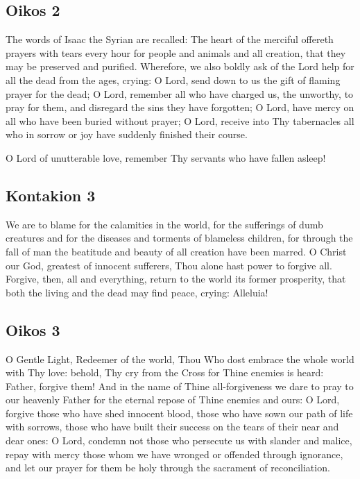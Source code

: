 \subsection{Oikos 2}

The words of Isaac the Syrian are recalled: The heart of the merciful offereth prayers with tears every hour for people and animals and all creation, that they may be preserved and purified. Wherefore, we also boldly ask of the Lord help for all the dead from the ages, crying: O Lord, send down to us the gift of flaming prayer for the dead; O Lord, remember all who have charged us, the unworthy, to pray for them, and disregard the sins they have forgotten; O Lord, have mercy on all who have been buried without prayer; O Lord, receive into Thy tabernacles all who in sorrow or joy have suddenly finished their course.

O Lord of unutterable love, remember Thy servants who have fallen asleep!

\subsection{Kontakion 3}

We are to blame for the calamities in the world, for the sufferings of dumb creatures and for the diseases and torments of blameless children, for through the fall of man the beatitude and beauty of all creation have been marred. O Christ our God, greatest of innocent sufferers, Thou alone hast power to forgive all. Forgive, then, all and everything, return to the world its former prosperity, that both the living and the dead may find peace, crying: Alleluia!

\subsection{Oikos 3}

O Gentle Light, Redeemer of the world, Thou Who dost embrace the whole world with Thy love: behold, Thy cry from the Cross for Thine enemies is heard: Father, forgive them! And in the name of Thine all-forgiveness we dare to pray to our heavenly Father for the eternal repose of Thine enemies and ours: O Lord, forgive those who have shed innocent blood, those who have sown our path of life with sorrows, those who have built their success on the tears of their near and dear ones: O Lord, condemn not those who persecute us with slander and malice, repay with mercy those whom we have wronged or offended through ignorance, and let our prayer for them be holy through the sacrament of reconciliation.

